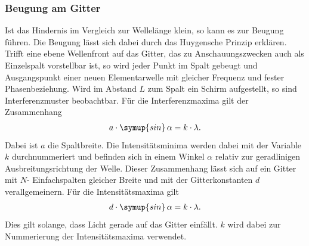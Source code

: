 \subsubsection{Beugung am Gitter}
\label{sec:Gitter1}
Ist das Hindernis im Vergleich zur Wellelänge klein, so kann es zur Beugung führen. Die Beugung lässt sich dabei durch das Huygensche
Prinzip erklären.\\
Trifft eine ebene Wellenfront auf das Gitter, das zu Anschauungszwecken auch als Einzelspalt vorstellbar ist, so wird jeder Punkt im
Spalt gebeugt und Ausgangspunkt einer neuen Elementarwelle mit gleicher Frequenz und fester Phasenbeziehung. Wird im Abstand $L$ zum Spalt
ein Schirm aufgestellt, so sind Interferenzmuster beobachtbar. Für die Interferenzmaxima gilt der Zusammenhang
\begin{align}
    \label{eqn:minima}
    a\cdot\symup{sin}\,\alpha = k\cdot\lambda.
\end{align}
Dabei ist $a$ die Spaltbreite. Die Intensitätsminima werden dabei mit der Variable $k$ durchnummeriert und befinden sich in einem
Winkel $\alpha$ relativ zur geradlinigen Ausbreitungsrichtung der Welle. Dieser Zusammenhang lässt sich auf ein Gitter mit $N$-
Einfachspalten gleicher Breite und mit der Gitterkonstanten $d$ verallgemeinern. Für die Intensitätsmaxima gilt
\begin{align}
    \label{eqn:maxima}
    d\cdot\symup{sin}\,\alpha = k\cdot\lambda.
\end{align}
Dies gilt solange, dass Licht gerade auf das Gitter einfällt. $k$ wird dabei zur Nummerierung der Intensitätsmaxima verwendet.